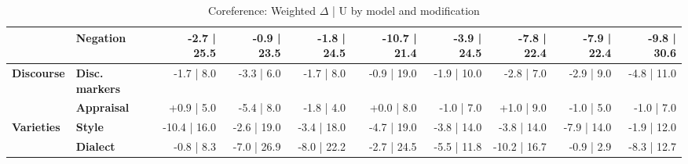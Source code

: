 \begin{table}[h]
{\begin{tabular}{llrrrrrrrr}
  & \textbf{Negation} & -2.7 | 25.5 & -0.9 | 23.5 & -1.8 | 24.5 & -10.7 | 21.4 & -3.9 | 24.5 & -7.8 | 22.4 & -7.9 | 22.4 & -9.8 | 30.6 \\
\midrule
\textbf{Discourse} & \textbf{Disc. markers} & -1.7 | 8.0 & -3.3 | 6.0 & -1.7 | 8.0 & -0.9 | 19.0 & -1.9 | 10.0 & -2.8 | 7.0 & -2.9 | 9.0 & -4.8 | 11.0 \\
  & \textbf{Appraisal} & +0.9 | 5.0 & -5.4 | 8.0 & -1.8 | 4.0 & +0.0 | 8.0 & -1.0 | 7.0 & +1.0 | 9.0 & -1.0 | 5.0 & -1.0 | 7.0 \\
\midrule
\textbf{Varieties} & \textbf{Style} & -10.4 | 16.0 & -2.6 | 19.0 & -3.4 | 18.0 & -4.7 | 19.0 & -3.8 | 14.0 & -3.8 | 14.0 & -7.9 | 14.0 & -1.9 | 12.0 \\
  & \textbf{Dialect} & -0.8 | 8.3 & -7.0 | 26.9 & -8.0 | 22.2 & -2.7 | 24.5 & -5.5 | 11.8 & -10.2 | 16.7 & -0.9 | 2.9 & -8.3 | 12.7 \\
\bottomrule
\end{tabular}}
\caption{Coreference: Weighted $\Delta$ | U by model and modification}\label{tab:coref_combined}
\end{table}